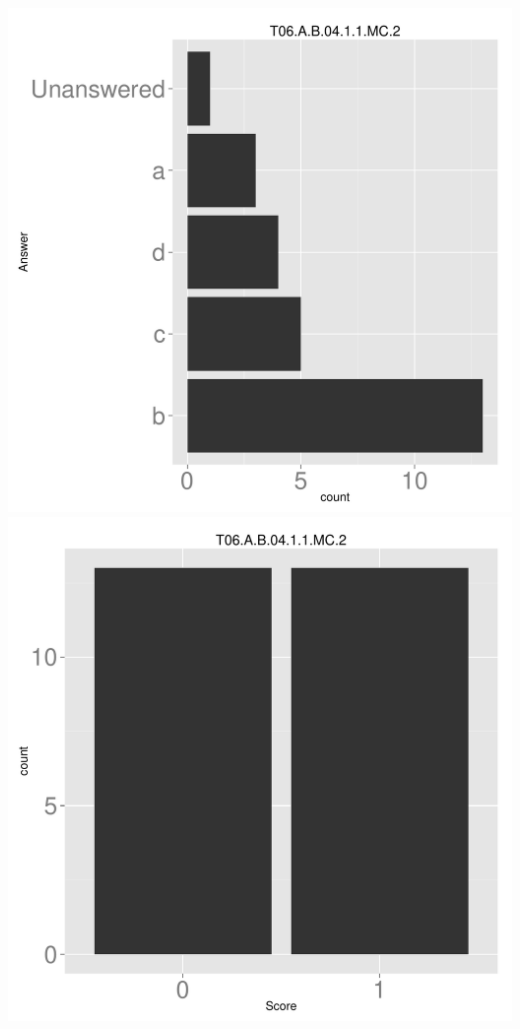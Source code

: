 \documentclass[12pt,nohyper]{tufte-handout}\usepackage[]{graphicx}\usepackage[]{color}
\begin{document}
\begin{center} \includegraphics[width=.45\linewidth]{Topic06_6_answer} \includegraphics[width=.45\linewidth]{Topic06_6_score} \end{center} 
\end{document}
